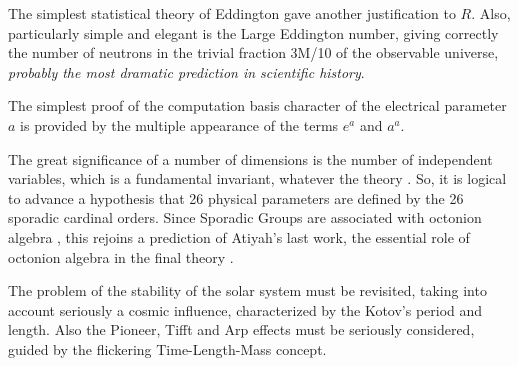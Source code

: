 \documentclass[twoside,draft]{article}
\begin{document}
\begin{sloppypar}
{The simplest statistical theory of Eddington gave another justification to $R$. Also, particularly
simple and elegant is the Large Eddington number, giving correctly the number of neutrons in the
trivial fraction 3M/10 of the observable universe, \textit{probably the most dramatic prediction in
 scientific history}.

The simplest proof of the computation basis character of the electrical parameter $a$ is provided
by the multiple appearance of the terms $e^{a}$ and $a^{a}$.

The great significance of a number of dimensions is the number of independent variables,
which is a fundamental invariant, whatever the theory \cite{Weigel}. So, it is logical to advance a
hypothesis that 26 physical parameters are defined by the 26 sporadic cardinal orders. Since
Sporadic Groups are associated with octonion algebra \cite{Atiyah2}, this rejoins a prediction of Atiyah's last
work, the essential role of octonion algebra in the final theory \cite{Koide}.

The problem of the stability of the solar system must be revisited, taking into account
seriously a cosmic influence, characterized by the Kotov's period and length. Also the Pioneer, Tifft
and Arp effects must be seriously considered, guided by the flickering Time-Length-Mass concept.

}
\end{sloppypar}
\end{document}
